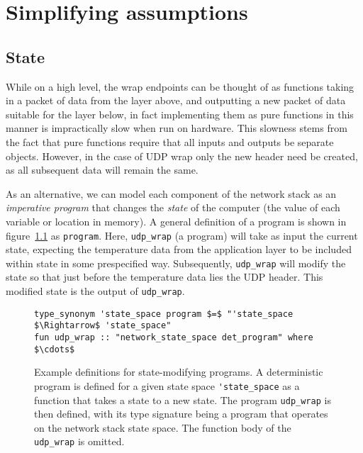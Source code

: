 \documentclass[twoside]{memoir}
\begin{document}

\chapter{Simplifying assumptions}
\section{State}
While on a high level, the wrap endpoints can be thought of as
functions taking in a packet of data from the layer above, and outputting a 
new packet of data suitable for the layer below,
in fact implementing them as pure functions in this manner
is impractically slow when run on hardware.
This slowness stems from the fact that pure functions require that all inputs and outputs be
separate objects.
However, in the case of UDP wrap only the new header need be created,
as all subsequent data will remain the same.

As an alternative, we can model each component of the network stack
as an \textit{imperative program} that changes the \textit{state} of the computer
(the value of each variable or location in memory). 
A general definition of a program is shown in figure~\ref{fig:prog-def-det-nondet} as \lstinline{program}.
Here, \lstinline{udp_wrap} (a program) will take as input the current state,
expecting the temperature data from the application layer to be included within state in some prespecified way.
Subsequently, \lstinline{udp_wrap} will modify the state so that just before the
temperature data lies the UDP header.
This modified state is the output of \lstinline{udp_wrap}.

\begin{figure}[htb]
    \centering
\begin{lstlisting}[language=isabelle]
type_synonym 'state_space program $=$ "'state_space $\Rightarrow$ 'state_space"
fun udp_wrap :: "network_state_space det_program" where $\cdots$
\end{lstlisting}
    \caption{Example definitions for state-modifying programs.
    A deterministic program is defined for a
    given state space \lstinline{'state_space}
    as a function that takes a state to a new state.
    The program \lstinline{udp_wrap} is then defined, with its type signature
    being a program that operates on the network stack state space.
    The function body of the \lstinline{udp_wrap} is omitted.
    }
    \label{fig:prog-def-det-nondet}
\end{figure}
\end{document}

